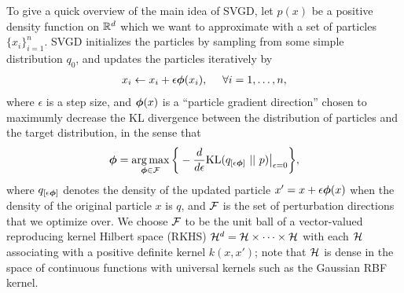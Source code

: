 \documentclass{article} %
\begin{document}
To give a quick overview of the main idea of SVGD, let $p(x)$ be a positive density function on $\mathbb{R}^d$ which we want to 
approximate with a set of particles 
$\{ x_i\}_{i=1}^n$. 
SVGD initializes the particles by sampling from some simple distribution $q_0$, and 
updates the particles iteratively by 
\begin{align}\label{equ:xxii}
x_i  \gets x_i +  \epsilon {\boldsymbol{\phi}}(x_i),  ~~~~ \forall i = 1, \ldots, n,  
\end{align}
where $\epsilon$ is a step size, and 
${\boldsymbol{\phi}}(x)$ is a ``particle gradient direction'' %
chosen to maximumly decrease the KL divergence between the distribution of particles and the target distribution, in the sense that  
\begin{align}\label{equ:ff00}
{\boldsymbol{\phi}} =   \operatorname*{arg\,max}_{{\boldsymbol{\phi}} \in {\mathcal F}}  \bigg\{  -   \frac{d}{d\epsilon} \mathrm{KL}(q_{[\epsilon{\boldsymbol{\phi}}]} ~|| ~ p) \big |_{\epsilon = 0}  \bigg\}, 
\end{align}
where $q_{[\epsilon {\boldsymbol{\phi}}]}$ denotes the density of the updated particle $x^\prime = x + \epsilon {\boldsymbol{\phi}}(x) $ when the density of the original particle $x$ is $q$, and ${\mathcal F}$ is the set of perturbation directions that we optimize over. 
We choose ${\mathcal F}$ to be the unit ball of a vector-valued reproducing kernel Hilbert space (RKHS) $\mathcal{H}^d = \mathcal{H} \times \cdots \times \mathcal{H}$ with each $\mathcal{H}$ associating with a positive definite kernel $k(x,x')$; 
note that $\mathcal{H}$ is dense in the space of continuous functions with universal kernels such as the Gaussian RBF kernel. 
\end{document}
